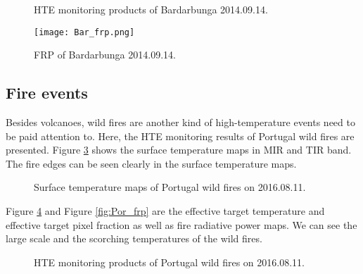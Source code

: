 \begin{figure}[!htbp]
\centering
{}
\hspace{0.1in}
\caption{HTE monitoring products of Bardarbunga 2014.09.14.}
\label{fig:Bar_HTE}
\end{figure}

\begin{figure}[!htbp]
\centering
\texttt{[image: Bar\_frp.png]}
\caption{FRP of Bardarbunga 2014.09.14.}
\label{fig:Bar_frp}
\end{figure}

\subsection{Fire events}
Besides volcanoes, wild fires are another kind of high-temperature events need to be paid attention to. Here, the HTE monitoring results of Portugal wild fires are presented. Figure \ref{fig:Por_sur_tem} shows the surface temperature maps in MIR and TIR band. The fire edges can be seen clearly in the surface temperature maps.\\

\begin{figure}
\centering
{}
\hspace{0.1in}
\caption{Surface temperature maps of Portugal wild fires on 2016.08.11.}
\label{fig:Por_sur_tem}
\end{figure}

\noindent Figure \ref{fig:Por_HTE} and Figure \ref{fig:Por_frp} are the effective target temperature and effective target pixel fraction as well as fire radiative power maps. We can see the large scale and the scorching temperatures of the wild fires.

\begin{figure}[!htbp]
\centering
{}
\hspace{0.1in}
\caption{HTE monitoring products of Portugal wild fires on 2016.08.11.}
\label{fig:Por_HTE}
\end{figure}

